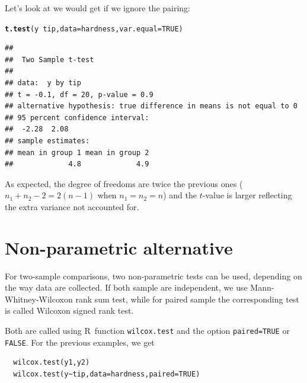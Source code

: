 \documentclass[11pt,a4paper]{memoir}\usepackage[]{graphicx}\usepackage[]{color}
\makeatletter
\newcommand{\hlnum}[1]{\textcolor[rgb]{0.686,0.059,0.569}{#1}}%
\newcommand{\hlopt}[1]{\textcolor[rgb]{0,0,0}{#1}}%
\newcommand{\hlstd}[1]{\textcolor[rgb]{0.345,0.345,0.345}{#1}}%
\newcommand{\hlkwc}[1]{\textcolor[rgb]{0.333,0.667,0.333}{#1}}%
\newcommand{\hlkwd}[1]{\textcolor[rgb]{0.737,0.353,0.396}{\textbf{#1}}}%
\newenvironment{kframe}{%
 \def\at@end@of@kframe{}%
 \ifinner\ifhmode%
  \def\at@end@of@kframe{\end{minipage}}%
  \begin{minipage}{\columnwidth}%
 \fi\fi%
 \def\FrameCommand##1{\hskip\@totalleftmargin \hskip-\fboxsep
 \colorbox{shadecolor}{##1}\hskip-\fboxsep
     \hskip-\linewidth \hskip-\@totalleftmargin \hskip\columnwidth}%
 \MakeFramed {\advance\hsize-\width
   \@totalleftmargin\z@ \linewidth\hsize
   \@setminipage}}%
 {\par\unskip\endMakeFramed%
 \at@end@of@kframe}
\newenvironment{knitrout}{}{} %
\newcommand{\R}{\textsf{R}}
\makeatother
\begin{document}

Let's look at we would get if we ignore the pairing:
\begin{knitrout}
\color{fgcolor}\begin{kframe}
\begin{alltt}
\hlkwd{t.test}\hlstd{(y} \hlopt{~} \hlstd{tip,} \hlkwc{data} \hlstd{= hardness,} \hlkwc{var.equal} \hlstd{=} \hlnum{TRUE}\hlstd{)}
\end{alltt}
\begin{verbatim}
## 
## 	Two Sample t-test
## 
## data:  y by tip
## t = -0.1, df = 20, p-value = 0.9
## alternative hypothesis: true difference in means is not equal to 0
## 95 percent confidence interval:
##  -2.28  2.08
## sample estimates:
## mean in group 1 mean in group 2 
##             4.8             4.9
\end{verbatim}
\end{kframe}
\end{knitrout}
  
As expected, the degree of freedoms are twice the previous ones
($n_1+n_2-2=2(n-1)$ when $n_1=n_2=n$) and the $t$-value is larger
reflecting the extra variance not accounted for.


\section{Non-parametric alternative}
For two-sample comparisons, two non-parametric tests can be used,
depending on the way data are collected. If both sample are
independent, we use Mann-Whitney-Wilcoxon rank sum test, while for
paired sample the corresponding test is called Wilcoxon signed rank
test. 

Both are called using \R\ function \texttt{wilcox.test} and the option
\texttt{paired=TRUE} or \texttt{FALSE}. For the previous examples, we get

\begin{verbatim}
  wilcox.test(y1,y2)
  wilcox.test(y~tip,data=hardness,paired=TRUE)
\end{verbatim}

\end{document}
